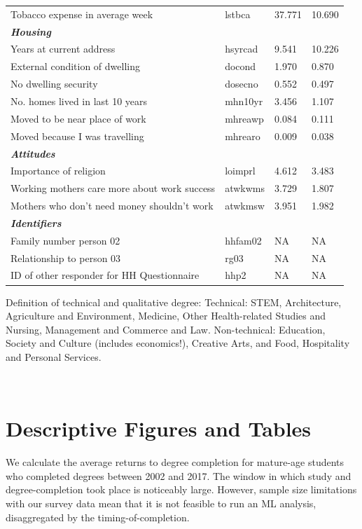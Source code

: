 \documentclass[12pt, a4paper]{article}
\begin{document}
\begin{longtable}{p{} C{0.15\textwidth} C{0.15\textwidth} C{0.15\textwidth}}
Tobacco expense in average week 	& 	lstbca	 & 	37.771	 & 	10.690	 \\
\textbf{\textit{Housing}} 	& 		 & 		 & 		 \\
Years at current address 	& 	hsyrcad	 & 	9.541	 & 	10.226	 \\
External condition of dwelling 	& 	docond	 & 	1.970	 & 	0.870	 \\
No dwelling security 	& 	dosecno	 & 	0.552	 & 	0.497	 \\
No.  homes lived in last 10 years 	& 	mhn10yr	 & 	3.456	 & 	1.107	 \\
Moved to be near place of work 	& 	mhreawp	 & 	0.084	 & 	0.111	 \\
Moved because I was travelling	& 	mhrearo	 & 	0.009	 & 	0.038	 \\
\textbf{\textit{Attitudes}} 	& 		 & 		 & 		 \\
Importance of religion 	& 	loimprl	 & 	4.612	 & 	3.483	 \\
Working mothers care more about work success 	& 	atwkwms	 & 	3.729	 & 	1.807	 \\
Mothers who don't need money shouldn't work 	& 	atwkmsw	 & 	3.951	 & 	1.982	 \\
\textbf{\textit{Identifiers}} 	& 		 & 		 & 		 \\
Family number person 02 	& 	hhfam02	 & 	NA	 & 	NA	 \\
Relationship to person 03 	& 	rg03	 & 	NA	 & 	NA	 \\
ID of other responder for HH Questionnaire 	& 	hhp2	 & 	NA	 & 	NA
\label{tab:sumstats}
\end{longtable}
\parbox{1.05\textwidth}{\footnotesize *Definition of technical and qualitative degree: Technical: STEM, Architecture, Agriculture and Environment, Medicine, Other Health-related Studies and Nursing, Management and Commerce and Law. Non-technical: Education, Society and Culture (includes economics!), Creative Arts, and Food, Hospitality and Personal Services.}  \\

\normalsize
\doublespacing

\section{Descriptive Figures and Tables}

We calculate the average returns to degree completion for mature-age students who completed degrees between 2002 and 2017. The window in which study and degree-completion took place is noticeably large. However, sample size limitations with our survey data mean that it is not feasible to run an ML analysis, disaggregated by the timing-of-completion.
\end{document}
